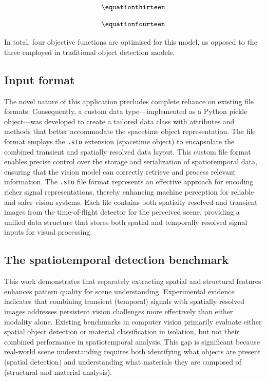 \documentclass[12pt,a4paper,oneside]{report}
\begin{document}
\begin{equation}
\label{eq:classification_loss}
\equationthirteen
\end{equation}

\begin{equation}
\label{eq:material_classification_loss}
\equationfourteen
\end{equation}

In total, four objective functions are optimised for this model, as opposed to the three employed in traditional object detection models.




\subsection{Input format}
\label{sec:input_format}

The novel nature of this application precludes complete reliance on existing file formats. Consequently, a custom data type—implemented as a Python pickle object—was developed to create a tailored data class with attributes and methods that better accommodate the spacetime object representation. The file format employs the \texttt{.sto} extension (spacetime object) to encapsulate the combined transient and spatially resolved data layout. This custom file format enables precise control over the storage and serialization of spatiotemporal data, ensuring that the vision model can correctly retrieve and process relevant information. The \texttt{.sto} file format represents an effective approach for encoding richer signal representations, thereby enhancing machine perception for reliable and safer vision systems. Each file contains both spatially resolved and transient images from the time-of-flight detector for the perceived scene, providing a unified data structure that stores both spatial and temporally resolved signal inputs for visual processing.





\subsection{The spatiotemporal detection benchmark}
\label{sec:spatiotemporal_detection_benchmark}

This work demonstrates that separately extracting spatial and structural features enhances pattern quality for scene understanding. Experimental evidence indicates that combining transient (temporal) signals with spatially resolved images addresses persistent vision challenges more effectively than either modality alone. Existing benchmarks in computer vision primarily evaluate either spatial object detection or material classification in isolation, but not their combined performance in spatiotemporal analysis. This gap is significant because real-world scene understanding requires both identifying what objects are present (spatial detection) and understanding what materials they are composed of (structural and material analysis).
\end{document}
